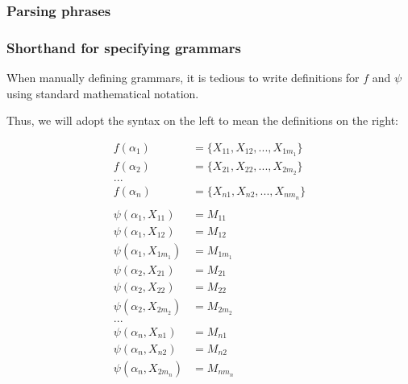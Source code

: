 \documentclass[main.tex]{subfiles}
\begin{document}
\subsubsection{Parsing phrases}
\subsubsection{Shorthand for specifying grammars}
\label{shorthand}
When manually defining grammars, it is tedious to write definitions
for $f$ and $\psi$ using standard mathematical notation.

Thus, we will adopt the syntax on the left to mean the definitions on the right:
\begin{center}
    \begin{minipage}{.4\textwidth}
    \end{minipage}
    \hspace{.15\textwidth}
    \begin{minipage}{.4\textwidth}
        \begin{align*}
            f(\alpha_1) &= \{ X_{11}, X_{12}, ..., X_{1m_1} \} \\
            f(\alpha_2) &= \{ X_{21}, X_{22}, ..., X_{2m_2} \} \\
            ...& \\
            f(\alpha_n) &= \{ X_{n1}, X_{n2}, ..., X_{nm_n} \} \\
            \\
            \psi(\alpha_1, X_{11}) &= M_{11} \\
            \psi(\alpha_1, X_{12}) &= M_{12} \\
            \psi(\alpha_1, X_{1m_1}) &= M_{1m_1} \\
            \psi(\alpha_2, X_{21}) &= M_{21} \\
            \psi(\alpha_2, X_{22}) &= M_{22} \\
            \psi(\alpha_2, X_{2m_2}) &= M_{2m_2} \\
            ...& \\
            \psi(\alpha_n, X_{n1}) &= M_{n1} \\
            \psi(\alpha_n, X_{n2}) &= M_{n2} \\
            \psi(\alpha_n, X_{2m_n}) &= M_{nm_n} \\
        \end{align*}
    \end{minipage}
\end{center}
\end{document}
